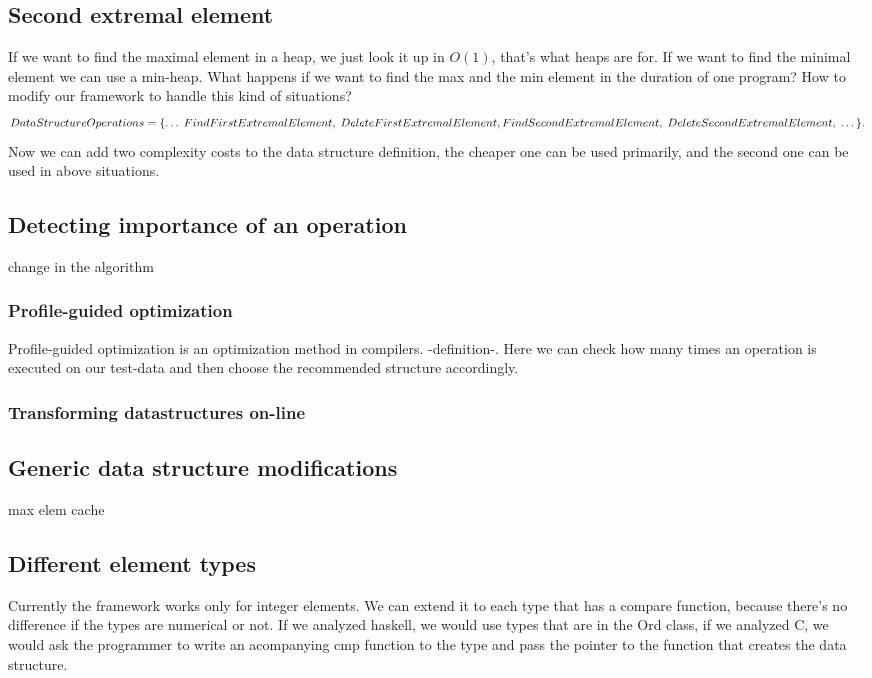 \documentclass[11pt]{article}
\begin{document}
	\subsection{Second extremal element}
		If we want to find the maximal element in a heap, we just look it up in $O(1)$, that's what heaps are for.
		If we want to find the minimal element we can use a min-heap. What happens if we want to find the max and the min element in the duration of one program?
		How to modify our framework to handle this kind of situations?
		\begin{equation}
		  	DataStructureOperations = \{\dots \; FindFirstExtremalElement,\; DeleteFirstExtremalElement, \; \\
			FindSecondExtremalElement,\; DeleteSecondExtremalElement, \; \dots\}.
		\end{equation}
		Now we can add two complexity costs to the data structure definition, the cheaper one can be used primarily, and the second one can be used in above situations.
	\subsection{Detecting importance of an operation}
		change in the algorithm
		\subsubsection{Profile-guided optimization}
			Profile-guided optimization is an optimization method in compilers. -definition-. Here we can check how many times an operation is executed on our test-data and then choose the recommended structure accordingly.
		\subsubsection{Transforming datastructures on-line}
	\subsection{Generic data structure modifications}

		max elem cache
	\subsection{Different element types}
		Currently the framework works only for integer elements. We can extend it to each type that has a compare function,
		because there's no difference if the types are numerical or not.
		If we analyzed haskell, we would use types that are in the Ord class,
		if we analyzed C, we would ask the programmer to write an acompanying cmp function to the type and pass the pointer to the function that creates the data structure.
\end{document}
